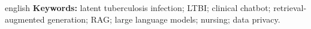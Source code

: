 \documentclass[
  12pt,
  oneside,
  a4paper,
  english,
  brazil
]{abntex2}
\begin{document}
\begin{resumo}[Abstract]
\begin{otherlanguage*}{english}
\vspace{\onelineskip}
\noindent\textbf{Keywords:} latent tuberculosis infection; LTBI; clinical chatbot;
retrieval-augmented generation; RAG; large language models; nursing; data privacy.
\end{otherlanguage*}
\end{resumo}

\listoffigures*
\cleardoublepage

\listofquadros
\cleardoublepage

\listoftables*
\cleardoublepage
\end{document}
